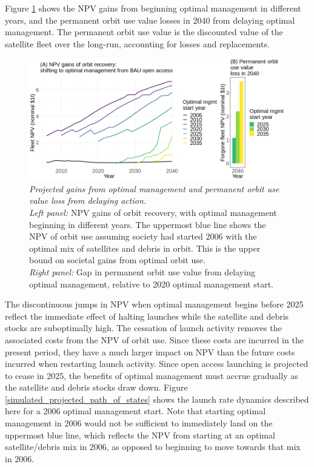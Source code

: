 \documentclass[12pt]{article}
\begin{document}
Figure \ref{costs_of_inaction} shows the NPV gains from beginning optimal management in different years, and the permanent orbit use value losses in 2040 from delaying optimal management. The permanent orbit use value is the discounted value of the satellite fleet over the long-run, accounting for losses and replacements.

\begin{figure}[H]
	\centering
	\includegraphics[width=\textwidth]{../../images/7_costs_of_inaction_2006_remfrac_0_remstart_2030.png}
	\captionsetup{format=hang}
	\caption[Permanent orbit use value loss from delaying action]{\textit{Projected gains from optimal management and permanent orbit use value loss from delaying action.} \\
		\textit{Left panel:} NPV gains of orbit recovery, with optimal management beginning in different years. The uppermost blue line shows the NPV of orbit use assuming society had started 2006 with the optimal mix of satellites and debris in orbit. This is the upper bound on societal gains from optimal orbit use. \\
		\textit{Right panel:} Gap in permanent orbit use value from delaying optimal management, relative to 2020 optimal management start. \\
	}
	\label{costs_of_inaction}
\end{figure}

The discontinuous jumps in NPV when optimal management begins before 2025 reflect the immediate effect of halting launches while the satellite and debris stocks are suboptimally high. The cessation of launch activity removes the associated costs from the NPV of orbit use. Since these costs are incurred in the present period, they have a much larger impact on NPV than the future costs incurred when restarting launch activity. Since open access launching is projected to cease in 2025, the benefits of optimal management must accrue gradually as the satellite and debris stocks draw down. Figure \ref{simulated_projected_path_of_states} shows the launch rate dynamics described here for a 2006 optimal management start. Note that starting optimal management in 2006 would not be sufficient to immediately land on the uppermost blue line, which reflects the NPV from starting at an optimal satellite/debris mix in 2006, as opposed to beginning to move towards that mix in 2006.
\end{document}
